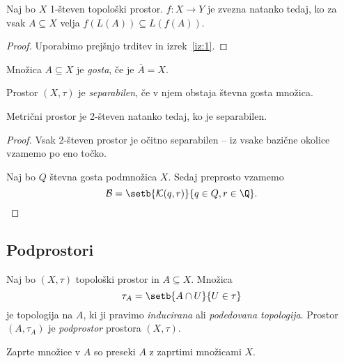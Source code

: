 \begin{trditev}
Naj bo $X$ 1-števen topološki prostor. $f \colon X \to Y$ je zvezna
natanko tedaj, ko za vsak $A \subseteq X$ velja
$f(L(A)) \subseteq L(f(A))$.
\end{trditev}

\begin{proof}
Uporabimo prejšnjo trditev in izrek~\ref{iz:1}.
\end{proof}


\begin{definicija}
Množica $A \subseteq X$ je \emph{gosta}, če je
$\overline{A} = X$.
\end{definicija}

\begin{definicija}
Prostor $(X, \tau)$ je
\emph{separabilen}, če v
njem obstaja števna gosta množica.
\end{definicija}

\begin{izrek}
Metrični prostor je 2-števen natanko tedaj, ko je separabilen.
\end{izrek}

\begin{proof}
Vsak 2-števen prostor je očitno separabilen -- iz vsake bazične
okolice vzamemo po eno točko.

Naj bo $Q$ števna gosta podmnožica $X$. Sedaj preprosto vzamemo
\[
\mathcal{B} = \setb{\mathcal{K}(q,r)}{q \in Q, r \in \Q}. \qedhere
\]
\end{proof}

\newpage

\subsection{Podprostori}

\begin{definicija}
Naj bo $(X, \tau)$ topološki prostor in $A \subseteq X$. Množica
\[
\tau_A = \setb{A \cap U}{U \in \tau}
\]
je topologija na $A$, ki ji pravimo \emph{inducirana} ali
\emph{podedovana topologija}. Prostor
$(A, \tau_A)$ je
\emph{podprostor} prostora
$(X, \tau)$.
\end{definicija}

\begin{trditev}
Zaprte množice v $A$ so preseki $A$ z zaprtimi množicami $X$.
\end{trditev}

